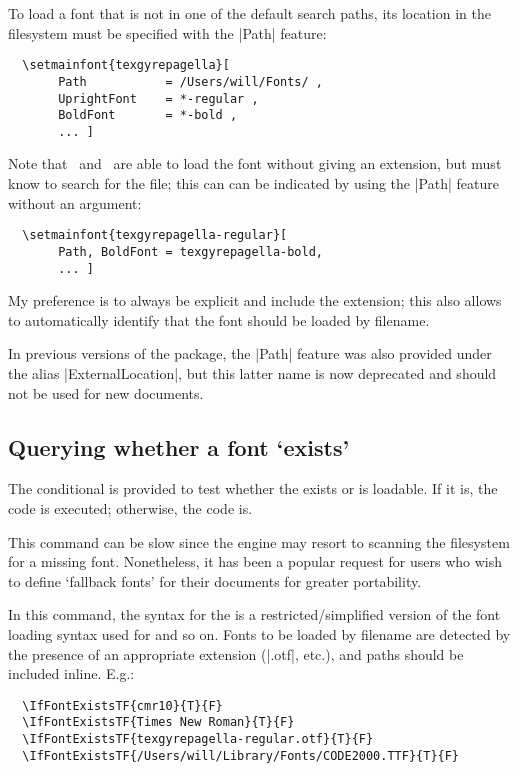 To load a font that is not in one of the default search paths, its location
in the filesystem must be specified with the |Path| feature:
\begin{Verbatim}
  \setmainfont{texgyrepagella}[
       Path           = /Users/will/Fonts/ ,
       UprightFont    = *-regular ,
       BoldFont       = *-bold ,
       ... ]
\end{Verbatim}
Note that \XeTeX\ and \LuaTeX\ are able to load the font without giving an
extension, but  must know to search for the file; this can can
be indicated by using the |Path| feature without an argument:
\begin{Verbatim}
  \setmainfont{texgyrepagella-regular}[
       Path, BoldFont = texgyrepagella-bold,
       ... ]
\end{Verbatim}
My preference is to always be explicit and include the extension; this also allows  to automatically identify that the font should be loaded by filename.

In previous versions of the package, the |Path| feature was also provided under the alias |ExternalLocation|, but this latter name is now deprecated and should not be used for new documents.


\subsection{Querying whether a font `exists'}


The conditional  is provided to test whether the  exists or is loadable.
If it is, the  code is executed; otherwise, the  code is.

This command can be slow since the engine may resort to scanning the filesystem for a missing font.
Nonetheless, it has been a popular request for users who wish to define `fallback fonts' for their documents for greater portability.

In this command, the syntax for the  is a restricted/simplified version of the font loading syntax used for  and so on.
Fonts to be loaded by filename are detected by the presence of an appropriate extension (|.otf|, etc.), and paths should be included inline.
E.g.:
\begin{Verbatim}
  \IfFontExistsTF{cmr10}{T}{F}
  \IfFontExistsTF{Times New Roman}{T}{F}
  \IfFontExistsTF{texgyrepagella-regular.otf}{T}{F}
  \IfFontExistsTF{/Users/will/Library/Fonts/CODE2000.TTF}{T}{F}
\end{Verbatim}

